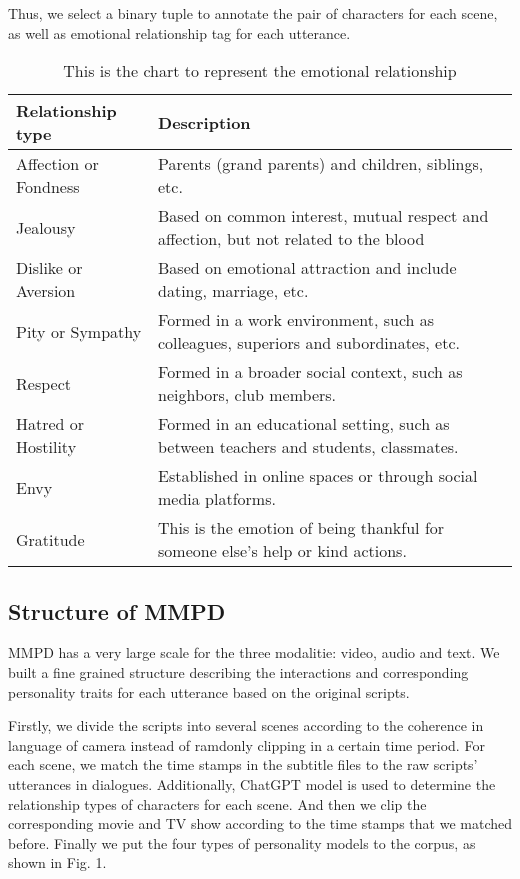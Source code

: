 \documentclass[11pt]{article}
\begin{document}
Thus, we select a binary tuple to annotate the pair of characters for each scene, as well as emotional relationship tag for each utterance.
\begin{table*}
  \centering
  \begin{tabular}{ll}
    \hline
    \textbf{Relationship type} & \textbf{Description}\\
    \hline
    Affection or Fondness & Parents (grand parents) and children, siblings, etc.\\
    \hline
    Jealousy & Based on common interest, mutual respect and affection, but not related to the blood\\
    \hline
    Dislike or Aversion & Based on emotional attraction and include dating, marriage, etc.\\
    \hline
    Pity or Sympathy & Formed in a work environment, such as colleagues, superiors and subordinates, etc.\\ 
    \hline
    Respect & Formed in a broader social context, such as neighbors, club members.\\
    \hline
    Hatred or Hostility & Formed in an educational setting, such as between teachers and students, classmates.\\
    \hline
    Envy & Established in online spaces or through social media platforms.\\
    \hline
    Gratitude & This is the emotion of being thankful for someone else's help or kind actions.\\
    \hline
  \end{tabular}
  \caption{This is the chart to represent the emotional relationship}
  \end{table*}
  

\subsection{Structure of MMPD}

MMPD has a very large scale for the three modalitie: video, audio and text. We built a fine grained structure describing the interactions and corresponding personality traits for each utterance based on the original scripts.

Firstly, we divide the scripts into several scenes according to the coherence in language of camera instead of ramdonly clipping in a certain time period. For each scene, we match the time stamps in the subtitle files to the raw scripts' utterances in dialogues. Additionally, ChatGPT model is used to determine the relationship types of characters for each scene. And then we clip the corresponding movie and TV show according to the time stamps that we matched before. Finally we put the four types of personality models to the corpus, as shown in Fig. 1.
\end{document}

